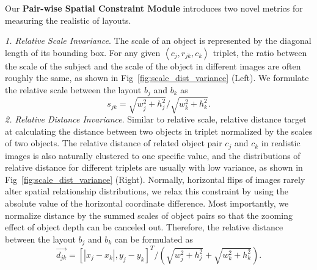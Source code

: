 Our \textbf{Pair-wise Spatial Constraint Module} introduces two novel metrics for measuring the realistic of layouts.

\noindent\textit{1. Relative Scale Invariance}. The scale of an object is represented by the diagonal length of its bounding box. For any given $\left \langle c_j, r_{jk}, c_k\right \rangle$ triplet, the ratio between the scale of the subject and the scale of the object in different images are often roughly the same, as shown in Fig~\ref{fig:scale_dist_variance} (Left). We formulate the relative scale between the layout $b_j$ and $b_k$ as
    \begin{equation}
        s_{jk} = {\sqrt{w_j^2+h_j^2}}\Big/{\sqrt{w_k^2+h_k^2}}.
    \end{equation}
\noindent\textit{2. Relative Distance Invariance}. Similar to relative scale, relative distance target at calculating the distance between two objects in triplet normalized by the scales of two objects. The relative distance of related object pair $c_j$ and $c_k$ in realistic images is also naturally clustered to one specific value, and the distributions of relative distance for different triplets are usually with low variance, as shown in Fig~\ref{fig:scale_dist_variance} (Right). Normally, horizontal flips of images rarely alter spatial relationship distributions, we relax this constraint by using the absolute value of the horizontal coordinate difference. Most importantly, we normalize distance by the summed scales of object pairs so that the zooming effect of object depth can be canceled out. Therefore, the relative distance between the layout $b_j$ and $b_k$ can be formulated as
    \begin{equation}
    \Vec{d_{jk}} = {[|x_j-x_k|, y_j-y_k]^T}\Big/{\left(\sqrt{w_j^2+h_j^2}+\sqrt{w_k^2+h_k^2}\right)}.
    \end{equation}


